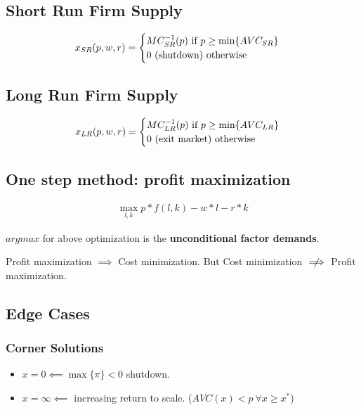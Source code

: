\documentclass[]{article}
\begin{document}
        \subsection{Short Run Firm Supply}
            \[
                x_{SR}(p, w, r) =
                \begin{cases}
                    MC_{SR}^{-1}(p) \text{{ if }} p \geq \min\{AVC_{SR}\} \\
                    0 \text{{ (shutdown) otherwise }} \\
                \end{cases}
            \]
        
        \subsection{Long Run Firm Supply}
            \[
                x_{LR}(p, w, r) =
                \begin{cases}
                    MC_{LR}^{-1}(p) \text{{ if }} p \geq \min\{AVC_{LR}\} \\
                    0 \text{{ (exit market) otherwise }} \\
                \end{cases}
            \]
        
        \subsection{One step method: profit maximization}
            \begin{gather*}
                \max_{l, k} p*f(l, k) - w*l - r*k
            \end{gather*}
            
            \begin{remark}
                $argmax$ for above optimization is the \textbf{unconditional factor demands}.
            \end{remark}
            
            \begin{remark}
                Profit maximization $\implies$ Cost minimization. But Cost minimization $\centernot \implies$ Profit maximization.
            \end{remark}
        
        \subsection{Edge Cases}
            \subsubsection{Corner Solutions}
                \begin{itemize}
                    \item $x = 0 \impliedby \max\{\pi\} < 0$ shutdown.
                    \item $x = \infty \impliedby$ increasing return to scale. ($AVC(x) < p \ \forall x \geq x^*$)
                \end{itemize}
\end{document}
